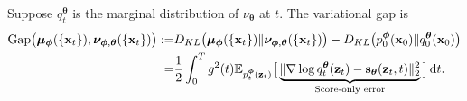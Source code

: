\documentclass{article}
\theoremstyle{definition}
\theoremstyle{remark}
\newcommand*\diff{\mathop{}\!\mathrm{d}}
\begin{document}
	\begingroup
	\renewcommand\theproposition{1}
	\begin{proposition}
		Suppose $q_{t}^{\bm{\theta}}$ is the marginal distribution of $\nu_{\bm{\theta}}$ at $t$. The variational gap is
		\begin{align*}
		\textup{Gap}\big(\bm{\mu}_{\bm{\phi}}(\{\mathbf{x}_{t}\}),\bm{\nu}_{\bm{\phi},\bm{\theta}}(\{\mathbf{x}_{t}\})\big):=&D_{KL}\big(\bm{\mu}_{\bm{\phi}}(\{\mathbf{x}_{t}\})\Vert\bm{\nu}_{\bm{\phi},\bm{\theta}}(\{\mathbf{x}_{t}\})\big)-D_{KL}\big(p_{0}^{\bm{\phi}}(\mathbf{x}_{0})\Vert q_{0}^{\bm{\theta}}(\mathbf{x}_{0})\big)\\
		=&\frac{1}{2}\int_{0}^{T}g^{2}(t)\mathbb{E}_{p_{t}^{\bm{\phi}}(\mathbf{z}_{t})}\big[\underbrace{\Vert\nabla\log{q_{t}^{\bm{\theta}}(\mathbf{z}_{t})}-\mathbf{s}_{\bm{\theta}}(\mathbf{z}_{t},t)\Vert_{2}^{2}}_{\text{Score-only error}}\big]\diff t.
		\end{align*}
	\end{proposition}
	\endgroup
\end{document}
